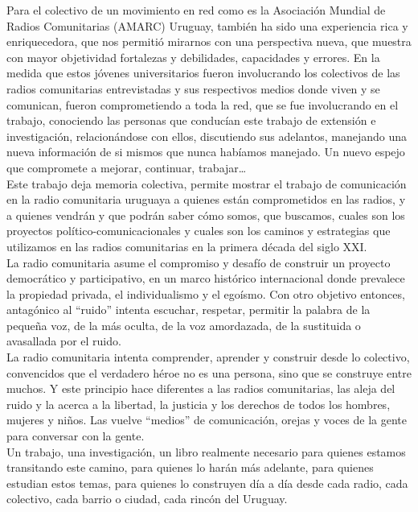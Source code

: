 Para el colectivo de un movimiento en red como es la Asociación Mundial de Radios Comunitarias (AMARC) Uruguay, también ha sido una experiencia rica y enriquecedora, que nos permitió mirarnos con una perspectiva nueva, que muestra con mayor objetividad fortalezas y debilidades, capacidades y errores. En la medida que estos jóvenes universitarios fueron involucrando los colectivos de las radios comunitarias entrevistadas y sus respectivos medios donde viven y se comunican, fueron comprometiendo a toda la red, que se fue involucrando en el trabajo, conociendo las personas que conducían este trabajo de extensión e investigación, relacionándose con ellos, discutiendo sus adelantos, manejando una nueva información de si mismos que nunca habíamos manejado. Un nuevo espejo que compromete a mejorar, continuar, trabajar…\\

Este trabajo deja memoria colectiva, permite mostrar el trabajo de comunicación en la radio comunitaria uruguaya a quienes están comprometidos en las radios, y a quienes vendrán y que podrán saber cómo somos, que buscamos, cuales son los proyectos político-comunicacionales y cuales son los caminos y estrategias que utilizamos en las radios comunitarias en la primera década del siglo XXI.\\

La radio comunitaria asume el compromiso y desafío de construir un proyecto democrático y participativo, en un marco histórico internacional donde prevalece la propiedad privada, el individualismo y el egoísmo. Con otro objetivo entonces, antagónico al “ruido” intenta escuchar, respetar, permitir la palabra de la pequeña voz, de la más oculta, de la voz amordazada, de la sustituida o avasallada por el ruido.\\

La radio comunitaria intenta comprender, aprender y construir desde lo colectivo, convencidos que el verdadero héroe no es una persona, sino que se construye entre muchos. Y este principio hace diferentes a las radios comunitarias, las aleja del ruido y la acerca a la libertad, la justicia y los derechos de todos los hombres, mujeres y niños. Las vuelve “medios” de comunicación, orejas y voces de la gente para conversar con la gente.\\

Un trabajo, una investigación, un libro realmente necesario para quienes estamos transitando este camino, para quienes lo harán más adelante, para quienes estudian estos temas, para quienes lo construyen día a día desde cada radio, cada colectivo, cada barrio o ciudad, cada rincón del Uruguay.\\

